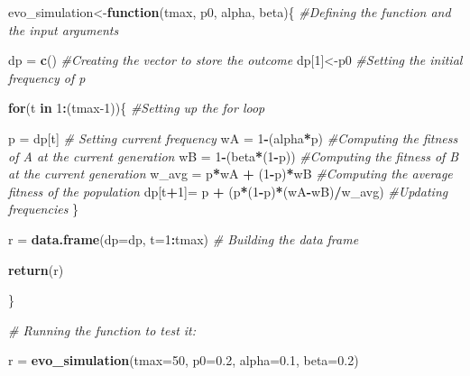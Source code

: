 \documentclass[
]{book}
\newenvironment{Shaded}{\begin{snugshade}}{\end{snugshade}}
\newcommand{\AttributeTok}[1]{\textcolor[rgb]{0.13,0.29,0.53}{#1}}
\newcommand{\CommentTok}[1]{\textcolor[rgb]{0.56,0.35,0.01}{\textit{#1}}}
\newcommand{\ControlFlowTok}[1]{\textcolor[rgb]{0.13,0.29,0.53}{\textbf{#1}}}
\newcommand{\DecValTok}[1]{\textcolor[rgb]{0.00,0.00,0.81}{#1}}
\newcommand{\FloatTok}[1]{\textcolor[rgb]{0.00,0.00,0.81}{#1}}
\newcommand{\FunctionTok}[1]{\textcolor[rgb]{0.13,0.29,0.53}{\textbf{#1}}}
\newcommand{\NormalTok}[1]{#1}
\newcommand{\OtherTok}[1]{\textcolor[rgb]{0.56,0.35,0.01}{#1}}
\newcommand{\SpecialCharTok}[1]{\textcolor[rgb]{0.81,0.36,0.00}{\textbf{#1}}}
\begin{document}
\begin{Shaded}
\begin{Highlighting}[]
\NormalTok{evo\_simulation}\OtherTok{\textless{}{-}}\ControlFlowTok{function}\NormalTok{(tmax, p0, alpha, beta)\{ }\CommentTok{\#Defining the function and the input arguments}
  
\NormalTok{  dp }\OtherTok{=} \FunctionTok{c}\NormalTok{() }\CommentTok{\#Creating the vector to store the outcome}
\NormalTok{  dp[}\DecValTok{1}\NormalTok{]}\OtherTok{\textless{}{-}}\NormalTok{p0 }\CommentTok{\#Setting the initial frequency of p}
  
  \ControlFlowTok{for}\NormalTok{(t }\ControlFlowTok{in} \DecValTok{1}\SpecialCharTok{:}\NormalTok{(tmax}\DecValTok{{-}1}\NormalTok{))\{ }\CommentTok{\#Setting up the for loop}
  
\NormalTok{  p }\OtherTok{=}\NormalTok{ dp[t] }\CommentTok{\# Setting current frequency}
\NormalTok{  wA }\OtherTok{=} \DecValTok{1}\SpecialCharTok{{-}}\NormalTok{(alpha}\SpecialCharTok{*}\NormalTok{p) }\CommentTok{\#Computing the fitness of A at the current generation}
\NormalTok{  wB }\OtherTok{=} \DecValTok{1}\SpecialCharTok{{-}}\NormalTok{(beta}\SpecialCharTok{*}\NormalTok{(}\DecValTok{1}\SpecialCharTok{{-}}\NormalTok{p)) }\CommentTok{\#Computing the fitness of B at the current generation}
\NormalTok{  w\_avg }\OtherTok{=}\NormalTok{ p}\SpecialCharTok{*}\NormalTok{wA }\SpecialCharTok{+}\NormalTok{ (}\DecValTok{1}\SpecialCharTok{{-}}\NormalTok{p)}\SpecialCharTok{*}\NormalTok{wB }\CommentTok{\#Computing the average fitness of the population}
\NormalTok{  dp[t}\SpecialCharTok{+}\DecValTok{1}\NormalTok{]}\OtherTok{=}\NormalTok{ p }\SpecialCharTok{+}\NormalTok{ (p}\SpecialCharTok{*}\NormalTok{(}\DecValTok{1}\SpecialCharTok{{-}}\NormalTok{p)}\SpecialCharTok{*}\NormalTok{(wA}\SpecialCharTok{{-}}\NormalTok{wB)}\SpecialCharTok{/}\NormalTok{w\_avg) }\CommentTok{\#Updating frequencies}
\NormalTok{\}}
  
\NormalTok{  r }\OtherTok{=} \FunctionTok{data.frame}\NormalTok{(}\AttributeTok{dp=}\NormalTok{dp, }\AttributeTok{t=}\DecValTok{1}\SpecialCharTok{:}\NormalTok{tmax) }\CommentTok{\# Building the data frame}
  
  \FunctionTok{return}\NormalTok{(r)}
  
\NormalTok{\}}

\CommentTok{\# Running the function to test it:}

\NormalTok{r }\OtherTok{=} \FunctionTok{evo\_simulation}\NormalTok{(}\AttributeTok{tmax=}\DecValTok{50}\NormalTok{, }\AttributeTok{p0=}\FloatTok{0.2}\NormalTok{, }\AttributeTok{alpha=}\FloatTok{0.1}\NormalTok{, }\AttributeTok{beta=}\FloatTok{0.2}\NormalTok{)}


\end{Highlighting}
\end{Shaded}
\end{document}
